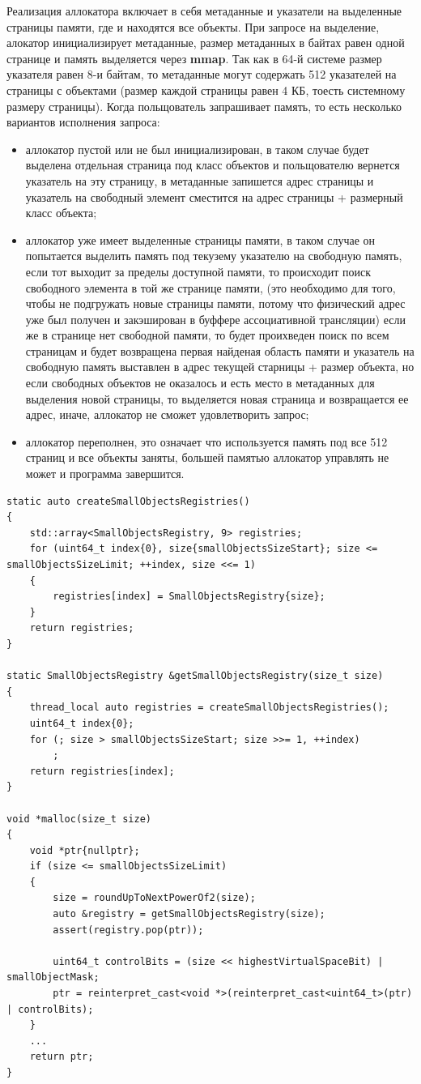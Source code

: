 Реализация аллокатора включает в себя метаданные и указатели на выделенные страницы памяти, где и находятся все объекты. При запросе на выделение, алокатор инициализирует метаданные, размер метаданных в байтах равен одной странице и память выделяется через \textbf{mmap}. Так как в 64-й системе размер указателя равен 8-и байтам, то метаданные могут содержать 512 указателей на страницы с объектами (размер каждой страницы равен 4 КБ, тоесть системному размеру страницы). Когда польщователь запрашивает память, то есть несколько вариантов исполнения запроса:
\begin{itemize}
	\item аллокатор пустой или не был инициализирован, в таком случае будет выделена отдельная страница под класс объектов и польщователю вернется указатель на эту страницу, в метаданные запишется адрес страницы и указатель на свободный элемент сместится на адрес страницы + размерный класс объекта;
	\item аллокатор уже имеет выделенные страницы памяти, в таком случае он попытается выделить память под текузему указателю на свободную память, если тот выходит за пределы доступной памяти, то происходит поиск свободного элемента в той же странице памяти, (это необходимо для того, чтобы не подгружать новые страницы памяти, потому что физический адрес уже был получен и закэширован в буффере ассоциативной трансляции) если же в странице нет свободной памяти, то будет проихведен поиск по всем страницам и будет возвращена первая найденая область памяти и указатель на свободную память выставлен в адрес текущей старницы + размер объекта, но если свободных объектов не оказалось и есть место в метаданных для выделения новой страницы, то выделяется новая страница и возвращается ее адрес, иначе, аллокатор не сможет удовлетворить запрос;
	\item аллокатор переполнен, это означает что используется память под все 512 страниц и все объекты заняты, большей памятью аллокатор управлять не может и программа завершится.
\end{itemize}

\begin{lstlisting}
static auto createSmallObjectsRegistries()
{
	std::array<SmallObjectsRegistry, 9> registries;
	for (uint64_t index{0}, size{smallObjectsSizeStart}; size <= smallObjectsSizeLimit; ++index, size <<= 1)
	{
		registries[index] = SmallObjectsRegistry{size};
	}
	return registries;
}
	
static SmallObjectsRegistry &getSmallObjectsRegistry(size_t size)
{
	thread_local auto registries = createSmallObjectsRegistries();
	uint64_t index{0};
	for (; size > smallObjectsSizeStart; size >>= 1, ++index)
		;
	return registries[index];
}

void *malloc(size_t size)
{
    void *ptr{nullptr};
	if (size <= smallObjectsSizeLimit)
	{
		size = roundUpToNextPowerOf2(size);
		auto &registry = getSmallObjectsRegistry(size);
		assert(registry.pop(ptr));
	
		uint64_t controlBits = (size << highestVirtualSpaceBit) | smallObjectMask;
		ptr = reinterpret_cast<void *>(reinterpret_cast<uint64_t>(ptr) | controlBits);
	}
	...
	return ptr;
}
\end{lstlisting}

